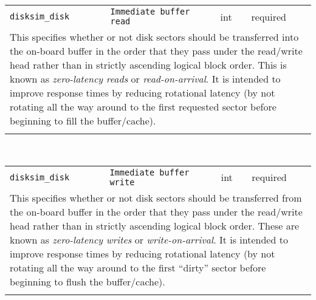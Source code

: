 \noindent 
\begin{tabular}{|p{1.5in}|p{3.5in}|p{0.5in}|p{0.5in}|}
\cline{1-4}
\texttt{disksim\_disk} & \texttt{Immediate buffer read} & int & required \\ 
\cline{1-4}
\multicolumn{4}{|p{6in}|}{
This specifies whether or not disk sectors should be transferred into the
on-board buffer in the order that they pass under the read/write head
rather than in strictly ascending logical block order. This is known
as {\it zero-latency reads} or {\it read-on-arrival}. It is intended
to improve response times by reducing rotational latency (by not
rotating all the way around to the first requested sector before
beginning to fill the buffer/cache).
}\\ 
\cline{1-4}
\multicolumn{4}{p{5in}}{}\\
\end{tabular}\\ 
\noindent 
\begin{tabular}{|p{1.5in}|p{3.5in}|p{0.5in}|p{0.5in}|}
\cline{1-4}
\texttt{disksim\_disk} & \texttt{Immediate buffer write} & int & required \\ 
\cline{1-4}
\multicolumn{4}{|p{6in}|}{
This specifies whether or not disk sectors should be transferred from the
on-board buffer in the order that they pass under the read/write head
rather than in strictly ascending logical block order. These are known
as {\it zero-latency writes} or {\it write-on-arrival}. It is
intended to improve response times by reducing rotational latency (by
not rotating all the way around to the first ``dirty'' sector before
beginning to flush the buffer/cache).
}\\ 
\cline{1-4}
\multicolumn{4}{p{5in}}{}\\
\end{tabular}\\ 
